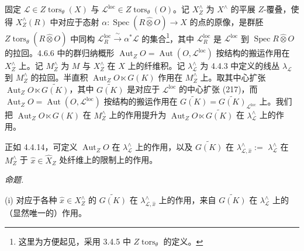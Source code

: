 固定 $\mathcal{L}\in Z\operatorname{tors}_{\theta}(X)$ 与 $\mathcal{L}^{\mathrm{loc}}\in Z\operatorname{tors}_{\theta}(O)$。记 $X_{Z}^{\wedge}$ 为 $X^{\wedge}$ 的平展 $Z$-覆叠，使得 $X_{Z}^{\wedge}(R)$ 中对应于态射 $\alpha:\operatorname{Spec}(R\hat\otimes O)\to X$ 的点的原像，是群胚 $Z\operatorname{tors}_{\theta}(R\hat\otimes O)$ 中同构 $\mathcal{L}_{R}^{\mathrm{loc}}\xrightarrow{\ \sim\ }\alpha^{*}\mathcal{L}$ 的集合\footnote{这里为方便起见，采用 3.4.5 中 $Z\operatorname{tors}_{\theta}$ 的定义。}，其中 $\mathcal{L}_{R}^{\mathrm{loc}}$ 是 $\mathcal{L}^{\mathrm{loc}}$ 到 $\operatorname{Spec}R\hat\otimes O$ 的拉回。4.6.6 中的群归纳概形 $\operatorname{Aut}_{Z}O=\operatorname{Aut}(O,\mathcal{L}^{\mathrm{loc}})$ 按结构的搬运作用在 $X_{Z}^{\wedge}$ 上。记 $M_{Z}^{\wedge}$ 为 $M$ 与 $X_{Z}^{\wedge}$ 在 $X$ 上的纤维积。记 $\lambda_{\mathcal{L}}^{\wedge}$ 为 4.4.3 中定义的线丛 $\lambda_{\mathcal{L}}$ 到 $M_{Z}^{\wedge}$ 的拉回。半直积 $\operatorname{Aut}_{Z}O\ltimes G(K)$ 作用在 $M_{Z}^{\wedge}$ 上。取其中心扩张 $\operatorname{Aut}_{Z}O\ltimes\widetilde{G(K)}$，其中 $\widetilde{G(K)}$ 是对应于 $\mathcal{L}^{\mathrm{loc}}$ 的中心扩张 (217)，而 $\operatorname{Aut}_{Z}O=\operatorname{Aut}(O,\mathcal{L}^{\mathrm{loc}})$ 按结构的搬运作用在 $\widetilde{G(K)}=\widetilde{G(K)}_{\mathcal{L}^{\mathrm{loc}}}$ 上。我们把 $\operatorname{Aut}_{Z}O\ltimes G(K)$ 在 $M_{Z}^{\wedge}$ 上的作用提升为 $\operatorname{Aut}_{Z}O\ltimes\widetilde{G(K)}$ 在 $\lambda_{\mathcal{L}}^{\wedge}$ 上的作用。

正如 4.4.14，可定义 $\operatorname{Aut}_{Z}O$ 在 $\lambda_{\mathcal{L}}^{\wedge}$ 上的作用，以及 $\widetilde{G(K)}$ 在 $\lambda_{\mathcal{L},\hat x}^{\wedge}:=$ $\lambda_{\mathcal{L}}^{\wedge}$ 在 $M_{Z}^{\wedge}$ 于 $\hat x\in\hat X_{Z}$ 处纤维上的限制上的作用。

 \emph{命题.}

(i) 对应于各种 $\hat x\in X_{Z}^{\wedge}$ 的 $\widetilde{G(K)}$ 在 $\lambda_{\mathcal{L},\hat x}^{\wedge}$ 上的作用，来自 $\widetilde{G(K)}$ 在 $\lambda_{\mathcal{L}}^{\wedge}$ 上的（显然唯一的）作用。
